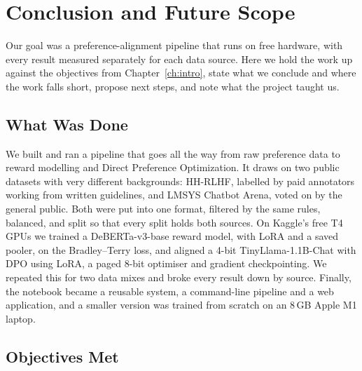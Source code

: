 \chapter{Conclusion and Future Scope}
\label{ch:conclusion}

Our goal was a preference-alignment pipeline that runs on free hardware, with every result measured separately for each data source. Here we hold the work up against the objectives from Chapter~\ref{ch:intro}, state what we conclude and where the work falls short, propose next steps, and note what the project taught us.

\section{What Was Done}
\label{sec:summary}

We built and ran a pipeline that goes all the way from raw preference data to reward modelling and Direct Preference Optimization. It draws on two public datasets with very different backgrounds: HH-RLHF, labelled by paid annotators working from written guidelines, and LMSYS Chatbot Arena, voted on by the general public. Both were put into one format, filtered by the same rules, balanced, and split so that every split holds both sources. On Kaggle's free T4 GPUs we trained a DeBERTa-v3-base reward model, with LoRA and a saved pooler, on the Bradley--Terry loss, and aligned a 4-bit TinyLlama-1.1B-Chat with DPO using LoRA, a paged 8-bit optimiser and gradient checkpointing. We repeated this for two data mixes and broke every result down by source. Finally, the notebook became a reusable system, a command-line pipeline and a web application, and a smaller version was trained from scratch on an 8\,GB Apple M1 laptop.

\section{Objectives Met}
\label{sec:achievements}

